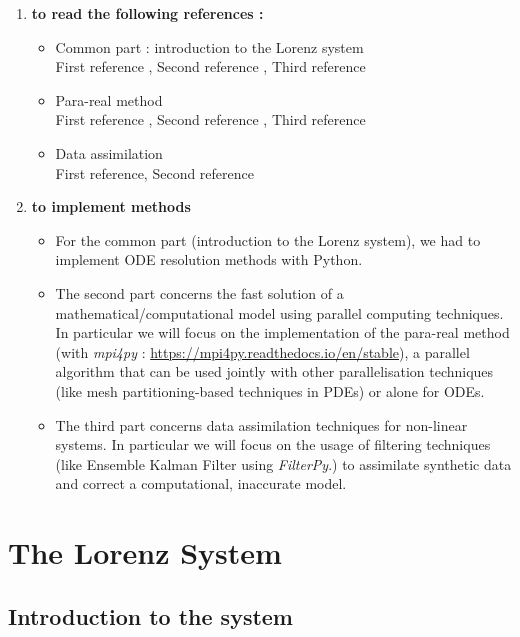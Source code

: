 \documentclass[12pt]{article}
\begin{document}
 	\begin{enumerate}[label=\textbullet]
 		\item \textbf{to read the following references :}
 		\begin{itemize}
 			\item Common part : introduction to the Lorenz system \\
 			\quad First reference \cite{partie1_ref1}, \quad Second reference \cite{partie1_ref2}, \quad Third reference \cite{partie1_ref3}
 			\item Para-real method \\
 			\quad First reference \cite{partie2_ref1}, \quad Second reference \cite{partie2_ref2}, \quad Third reference \cite{partie2_ref3}
 			\item Data assimilation \\
 			\quad First reference, \quad Second reference \cite{partie3_ref2}
 		\end{itemize}
 		\item \textbf{to implement methods} 
 		\begin{itemize}
 			\item For the common part (introduction to the Lorenz system), we had to implement ODE resolution methods with Python.
 			\item The second part concerns the fast solution of a mathematical/computational model using parallel computing techniques. In particular we will focus on the implementation of the para-real method (with \textit{mpi4py} : \url{https://mpi4py.readthedocs.io/en/stable}), a parallel algorithm that can be used jointly with other parallelisation  techniques (like mesh partitioning-based techniques in PDEs) or alone for ODEs.
 			\item The third part concerns data assimilation techniques for non-linear systems. In particular we will focus on the usage of filtering techniques (like Ensemble Kalman Filter using \textit{FilterPy}.) to assimilate synthetic data and correct a computational, inaccurate model.
 		\end{itemize}
 	\end{enumerate}
	
	\newpage
	
	\section{The Lorenz System}
	
	\subsection{Introduction to the system}
	
\end{document}
